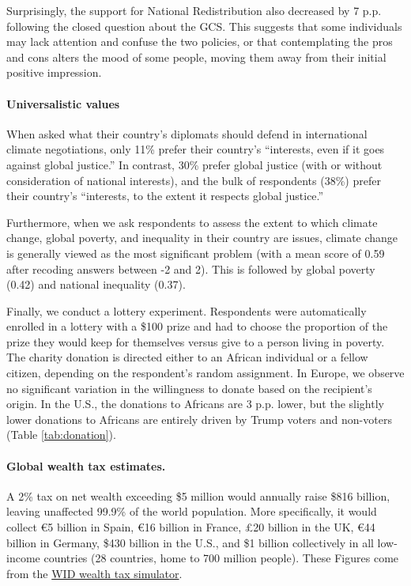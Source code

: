 \begin{bibunit}
\begin{small}
Surprisingly, the support for National Redistribution also decreased by 7 p.p. following the closed question about the GCS. This suggests that some individuals may lack attention and confuse the two policies, or that contemplating the pros and cons alters the mood of some people, moving them away from their initial positive impression.

\paragraph{\small Universalistic values}
When asked what their country's diplomats should defend in international climate negotiations, only 11\% prefer their country's ``interests, even if it goes against global justice.'' In contrast, 30\% prefer global justice (with or without consideration of national interests), and the bulk of respondents (38\%) prefer their country's ``interests, to the extent it respects global justice.''

Furthermore, when we ask respondents to assess the extent to which climate change, global poverty, and inequality in their country are issues, climate change is generally viewed as the most significant problem %
(with a mean score of 0.59 after recoding answers between -2 and 2). This is followed by global poverty (0.42) and national inequality (0.37). %

Finally, we conduct a lottery experiment. %
Respondents were automatically enrolled in a lottery with a \$100 prize and had to choose the proportion of the prize they would keep for themselves versus give to a person living in poverty. The %
charity donation is directed either to an African individual or a fellow citizen, depending on the respondent's random assignment. In Europe, we observe no significant variation in the willingness to donate based on the recipient's origin. In the U.S., the donations to Africans are 3 p.p. lower, %
but the slightly lower donations to Africans are entirely driven by Trump voters and non-voters (Table \ref{tab:donation}).

\paragraph{\small Global wealth tax estimates.}
A 2\% tax on net wealth exceeding \$5 million would annually raise \$816 billion, leaving unaffected 99.9\% of the world population. More specifically, it would collect \euro{}5 billion in Spain, \euro{}16 billion in France, £20 billion in the UK, \euro{}44 billion in Germany, \$430 billion in the U.S., and \$1 billion collectively in all low-income countries (28 countries, home to 700 million people). These Figures come from the \href{https://wid.world/world-wealth-tax-simulator/}{WID wealth tax simulator}.\cite{chancel_world_2022}


\end{small}
\end{bibunit}
